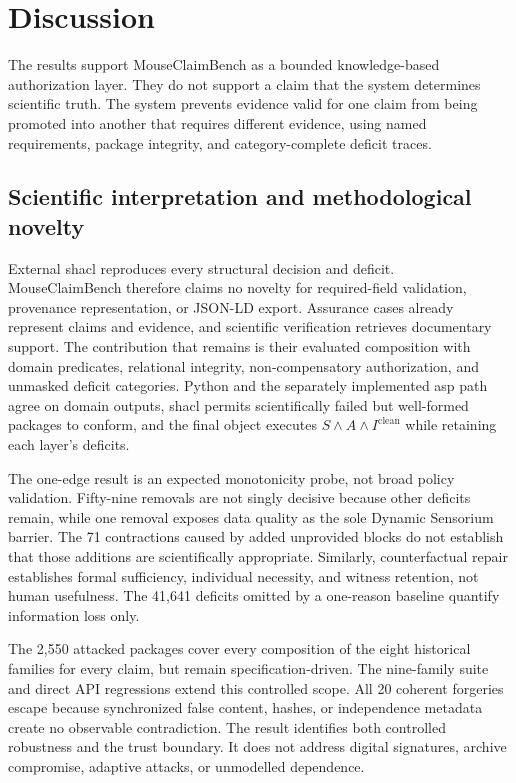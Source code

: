 \section{Discussion}
\label{sec:discussion}

The results support MouseClaimBench as a bounded knowledge-based authorization layer. They do not support a claim that the system determines scientific truth. The system prevents evidence valid for one claim from being promoted into another that requires different evidence, using named requirements, package integrity, and category-complete deficit traces.

\subsection{Scientific interpretation and methodological novelty}
\label{subsec:interpretation-novelty}

External \ac{shacl} reproduces every structural decision and deficit. MouseClaimBench therefore claims no novelty for required-field validation, provenance representation, or JSON-LD export. Assurance cases already represent claims and evidence, and scientific verification retrieves documentary support. The contribution that remains is their evaluated composition with domain predicates, relational integrity, non-compensatory authorization, and unmasked deficit categories. Python and the separately implemented \ac{asp} path agree on domain outputs, \ac{shacl} permits scientifically failed but well-formed packages to conform, and the final object executes $S\land A\land I^{\mathrm{clean}}$ while retaining each layer's deficits.

The one-edge result is an expected monotonicity probe, not broad policy validation. Fifty-nine removals are not singly decisive because other deficits remain, while one removal exposes data quality as the sole Dynamic Sensorium barrier. The 71 contractions caused by added unprovided blocks do not establish that those additions are scientifically appropriate. Similarly, counterfactual repair establishes formal sufficiency, individual necessity, and witness retention, not human usefulness. The 41,641 deficits omitted by a one-reason baseline quantify information loss only.

The 2,550 attacked packages cover every composition of the eight historical families for every claim, but remain specification-driven. The nine-family suite and direct API regressions extend this controlled scope. All 20 coherent forgeries escape because synchronized false content, hashes, or independence metadata create no observable contradiction. The result identifies both controlled robustness and the trust boundary. It does not address digital signatures, archive compromise, adaptive attacks, or unmodelled dependence.

